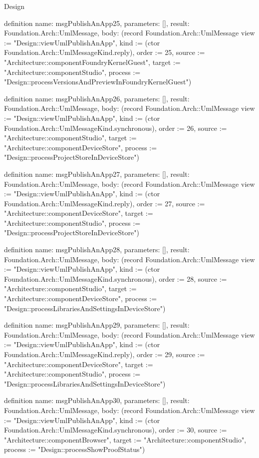 \begin{lexlean}{Design}
\begin{semanticmodule}
definition{
  name: msgPublishAnApp25,
  parameters: [],
  result: Foundation.Arch::UmlMessage,
  body: (record Foundation.Arch::UmlMessage {view := "Design::viewUmlPublishAnApp", kind := (ctor Foundation.Arch::UmlMessageKind.reply), order := 25, source := "Architecture::componentFoundryKernelGuest", target := "Architecture::componentStudio", process := "Design::processVersionsAndPreviewInFoundryKernelGuest"})
}

definition{
  name: msgPublishAnApp26,
  parameters: [],
  result: Foundation.Arch::UmlMessage,
  body: (record Foundation.Arch::UmlMessage {view := "Design::viewUmlPublishAnApp", kind := (ctor Foundation.Arch::UmlMessageKind.synchronous), order := 26, source := "Architecture::componentStudio", target := "Architecture::componentDeviceStore", process := "Design::processProjectStoreInDeviceStore"})
}

definition{
  name: msgPublishAnApp27,
  parameters: [],
  result: Foundation.Arch::UmlMessage,
  body: (record Foundation.Arch::UmlMessage {view := "Design::viewUmlPublishAnApp", kind := (ctor Foundation.Arch::UmlMessageKind.reply), order := 27, source := "Architecture::componentDeviceStore", target := "Architecture::componentStudio", process := "Design::processProjectStoreInDeviceStore"})
}

definition{
  name: msgPublishAnApp28,
  parameters: [],
  result: Foundation.Arch::UmlMessage,
  body: (record Foundation.Arch::UmlMessage {view := "Design::viewUmlPublishAnApp", kind := (ctor Foundation.Arch::UmlMessageKind.synchronous), order := 28, source := "Architecture::componentStudio", target := "Architecture::componentDeviceStore", process := "Design::processLibrariesAndSettingsInDeviceStore"})
}

definition{
  name: msgPublishAnApp29,
  parameters: [],
  result: Foundation.Arch::UmlMessage,
  body: (record Foundation.Arch::UmlMessage {view := "Design::viewUmlPublishAnApp", kind := (ctor Foundation.Arch::UmlMessageKind.reply), order := 29, source := "Architecture::componentDeviceStore", target := "Architecture::componentStudio", process := "Design::processLibrariesAndSettingsInDeviceStore"})
}

definition{
  name: msgPublishAnApp30,
  parameters: [],
  result: Foundation.Arch::UmlMessage,
  body: (record Foundation.Arch::UmlMessage {view := "Design::viewUmlPublishAnApp", kind := (ctor Foundation.Arch::UmlMessageKind.synchronous), order := 30, source := "Architecture::componentBrowser", target := "Architecture::componentStudio", process := "Design::processShowProofStatus"})
}


\end{semanticmodule}
\end{lexlean}
